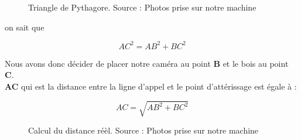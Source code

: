  \begin{figure}[H]%
 	\center%
 	\setlength{\fboxsep}{5pt}%
 	\setlength{\fboxrule}{0.5pt}%
 	\caption[Triangle de Pythagore]{Triangle de Pythagore. Source : Photos prise sur notre machine}
 	\label{fig:Triangle de Pythagore}
 \end{figure}
 
 on sait que 
 
\[AC^2 = AB^2 + BC^2\]
 
 Nous avons donc décider de placer notre caméra au point \textbf{B} et le bois au point \textbf{C}. \\ \textbf{AC} qui est la distance entre la ligne d'appel et le point d'attérissage est égale à : 
 
 \[AC = \sqrt{AB^2 + BC^2}\]
 
 
 \begin{figure}[H]%
 	\center%
 	\setlength{\fboxsep}{5pt}%
 	\setlength{\fboxrule}{0.5pt}%
 	\caption[Calcul du distance réèl]{Calcul du distance réèl. Source : Photos prise sur notre machine}
 	\label{fig:Calcul du distance réèl}
 \end{figure}
 
